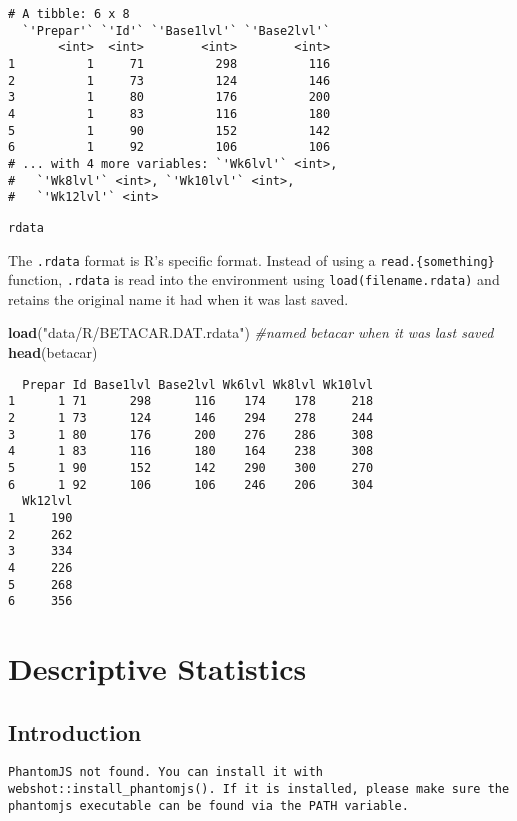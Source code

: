 \documentclass[12pt,]{article}
\newenvironment{Shaded}{\begin{snugshade}}{\end{snugshade}}
\newcommand{\KeywordTok}[1]{\textcolor[rgb]{0.13,0.29,0.53}{\textbf{#1}}}
\newcommand{\StringTok}[1]{\textcolor[rgb]{0.31,0.60,0.02}{#1}}
\newcommand{\CommentTok}[1]{\textcolor[rgb]{0.56,0.35,0.01}{\textit{#1}}}
\newcommand{\NormalTok}[1]{#1}
\theoremstyle{definition}
\theoremstyle{definition}
\theoremstyle{definition}
\theoremstyle{remark}
\begin{document}
\begin{verbatim}
# A tibble: 6 x 8
  `'Prepar'` `'Id'` `'Base1lvl'` `'Base2lvl'`
       <int>  <int>        <int>        <int>
1          1     71          298          116
2          1     73          124          146
3          1     80          176          200
4          1     83          116          180
5          1     90          152          142
6          1     92          106          106
# ... with 4 more variables: `'Wk6lvl'` <int>,
#   `'Wk8lvl'` <int>, `'Wk10lvl'` <int>,
#   `'Wk12lvl'` <int>
\end{verbatim}

\texttt{rdata}

The \texttt{.rdata} format is R's specific format. Instead of using a
\texttt{read.\{something\}} function, \texttt{.rdata} is read into the
environment using \texttt{load(filename.rdata)} and retains the original
name it had when it was last saved.

\begin{Shaded}
\begin{Highlighting}[]
\KeywordTok{load}\NormalTok{(}\StringTok{"data/R/BETACAR.DAT.rdata"}\NormalTok{)  }\CommentTok{#named betacar when it was last saved}
\KeywordTok{head}\NormalTok{(betacar)}
\end{Highlighting}
\end{Shaded}

\begin{verbatim}
  Prepar Id Base1lvl Base2lvl Wk6lvl Wk8lvl Wk10lvl
1      1 71      298      116    174    178     218
2      1 73      124      146    294    278     244
3      1 80      176      200    276    286     308
4      1 83      116      180    164    238     308
5      1 90      152      142    290    300     270
6      1 92      106      106    246    206     304
  Wk12lvl
1     190
2     262
3     334
4     226
5     268
6     356
\end{verbatim}

\section{Descriptive Statistics}\label{descriptive-statistics}

\subsection{Introduction}\label{introduction}

\begin{verbatim}
PhantomJS not found. You can install it with webshot::install_phantomjs(). If it is installed, please make sure the phantomjs executable can be found via the PATH variable.
\end{verbatim}
\end{document}
